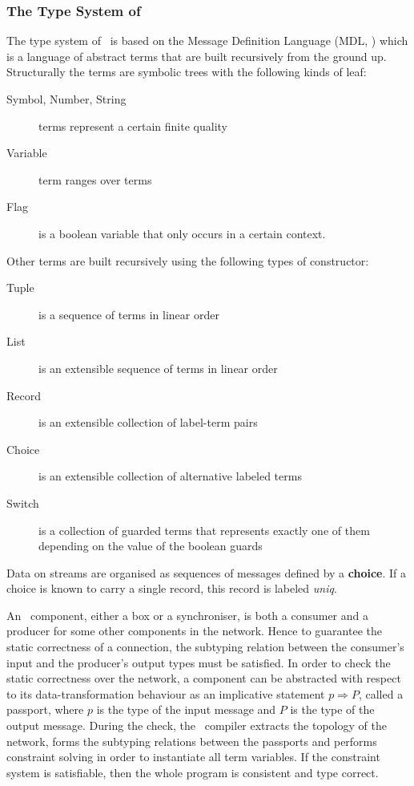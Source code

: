    \subsubsection{The Type System of \ak\ }
The type system of \ak\ is based on the Message Definition Language (MDL, \cite{astrakahn}) which is a language of abstract terms that are built recursively from the ground up. Structurally the terms are symbolic trees with the following kinds of leaf:
\begin{description}
\item[Symbol, Number, String] terms represent a certain finite quality
\item[Variable] term ranges over terms
\item[Flag] is a boolean variable that only occurs in a certain context.
\end{description}
Other terms are built recursively using the following types of constructor:
\begin{description}
\item[Tuple] is a sequence of terms in linear order
\item[List] is an extensible sequence of terms in linear order
\item[Record] is an extensible collection of label-term pairs
\item[Choice] is an extensible collection of alternative labeled terms
\item[Switch] is a collection of guarded terms that represents exactly one of them depending on the value of the boolean guards
\end{description}

Data on streams are organised as sequences of messages defined by a \textbf{choice}. If a choice is known to carry a single record, this record is labeled \emph{uniq}.

An \ak\ component, either a box or a synchroniser, is both a consumer and a producer for some other components in the network. Hence to guarantee the static correctness of a connection, the subtyping relation between the consumer's input and the producer's output types must be satisfied. In order to check the static correctness over the network, a component can be abstracted with respect to its data-transformation behaviour as an implicative statement $p \Rightarrow P$, called a passport, where $p$ is the type of the input message and $P$ is the type of the output message. During the check, the \ak\ compiler extracts the topology of the network, forms the subtyping relations between the passports and performs constraint solving in order to instantiate all term variables. If the constraint system is satisfiable, then the whole program is consistent and type correct.


